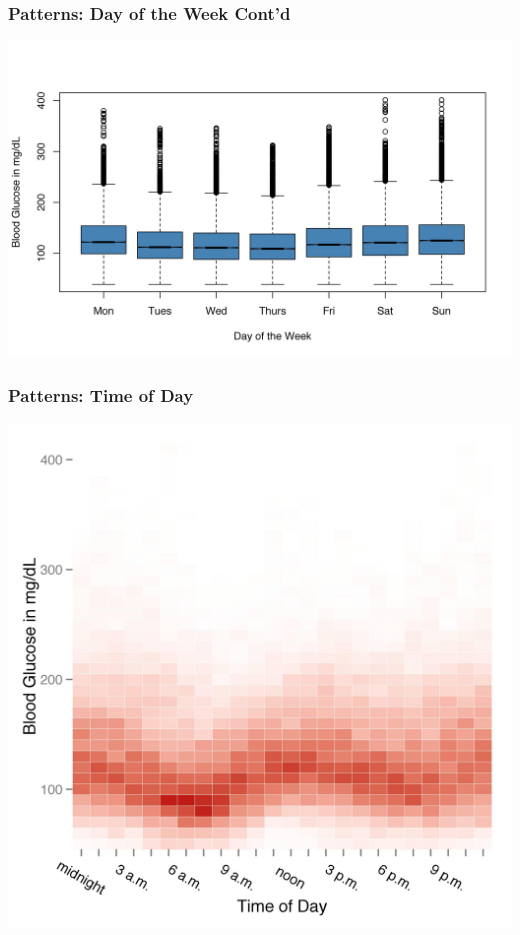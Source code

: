 \documentclass{beamer}
\begin{document}
\begin{frame}
  \frametitle{Patterns: Day of the Week Cont'd}
  
  \begin{center}
    \includegraphics[width=\textwidth]{day_boxplots.jpg}
  \end{center}

\end{frame}

\begin{frame}
  \frametitle{Patterns: Time of Day}
  
  \begin{center}
    \includegraphics[height=0.9\textheight]{all_heatmap.jpg}
  \end{center}
\end{frame}
\end{document}
